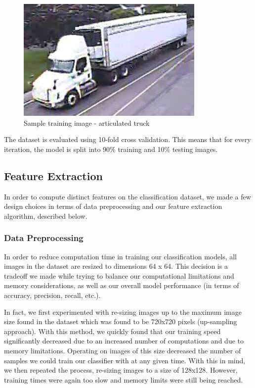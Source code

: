 \documentclass[12pt]{article}
\begin{document}
\begin{figure}[!htb]
    \centering
    \includegraphics{articulated_truck.jpg}
    \caption{Sample training image - articulated truck}
    \label{fig:articulated_truck}
\end{figure}

The dataset is evaluated using 10-fold cross validation. This means that for every iteration, the model is split into 90\% training and 10\% testing images. 

\subsection{Feature Extraction}

In order to compute distinct features on the classification dataset, we made a few design choices in terms of data preprocessing and our feature extraction algorithm, described below.

\subsubsection{Data Preprocessing}

In order to reduce computation time in training our classification models, all images in the dataset are resized to dimensions 64 x 64. This decision is a tradeoff we made while trying to balance our computational limitations and memory considerations, as well as our overall model performance (in terms of accuracy, precision, recall, etc.).

In fact, we first experimented with re-sizing images up to the maximum image size found in the dataset which was found to be 720x720 pixels (up-sampling approach). With this method, we quickly found that our training speed significantly decreased due to an increased number of computations and due to memory limitations. Operating on images of this size decreased the number of samples we could train our classifier with at any given time. With this in mind, we then repeated the process, re-sizing images to a size of 128x128. However, training times were again too slow and memory limits were still being reached. 
\end{document}
